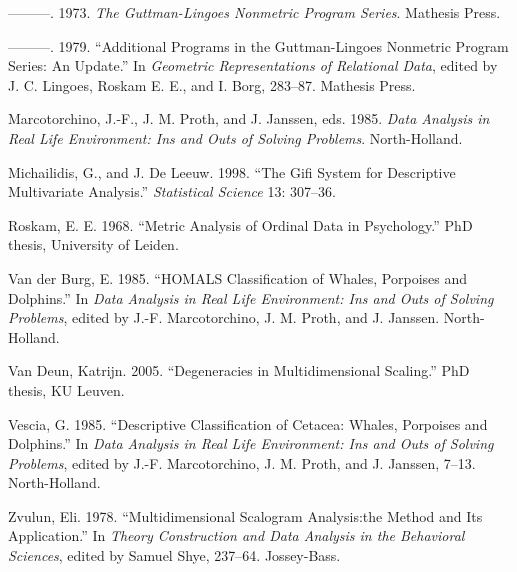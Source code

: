 \documentclass[
  12pt,
]{article}
\newlength{\cslhangindent}
\newenvironment{CSLReferences}[2] %
 {\begin{list}{}{%
  \setlength{\itemindent}{0pt}
  \setlength{\leftmargin}{0pt}
  \setlength{\parsep}{0pt}
  \ifodd #1
   \setlength{\leftmargin}{\cslhangindent}
   \setlength{\itemindent}{-1\cslhangindent}
  \fi
  \setlength{\itemsep}{#2\baselineskip}}}
 {\end{list}}
\begin{document}
\begin{CSLReferences}{1}{0}
---------. 1973. \emph{{The Guttman-Lingoes Nonmetric Program Series}}. Mathesis Press.

---------. 1979. {``Additional Programs in the Guttman-Lingoes Nonmetric Program Series: An Update.''} In \emph{{Geometric Representations of Relational Data}}, edited by J. C. Lingoes, Roskam E. E., and I. Borg, 283--87. Mathesis Press.

Marcotorchino, J.-F., J. M. Proth, and J. Janssen, eds. 1985. \emph{Data Analysis in Real Life Environment: Ins and Outs of Solving Problems}. North-Holland.

Michailidis, G., and J. De Leeuw. 1998. {``The Gifi System for Descriptive Multivariate Analysis.''} \emph{Statistical Science} 13: 307--36.

Roskam, E. E. 1968. {``{Metric Analysis of Ordinal Data in Psychology}.''} PhD thesis, University of Leiden.

Van der Burg, E. 1985. {``HOMALS Classification of Whales, Porpoises and Dolphins.''} In \emph{Data Analysis in Real Life Environment: Ins and Outs of Solving Problems}, edited by J.-F. Marcotorchino, J. M. Proth, and J. Janssen. North-Holland.

Van Deun, Katrijn. 2005. {``Degeneracies in Multidimensional Scaling.''} PhD thesis, KU Leuven.

Vescia, G. 1985. {``Descriptive Classification of Cetacea: Whales, Porpoises and Dolphins.''} In \emph{Data Analysis in Real Life Environment: Ins and Outs of Solving Problems}, edited by J.-F. Marcotorchino, J. M. Proth, and J. Janssen, 7--13. North-Holland.

Zvulun, Eli. 1978. {``Multidimensional Scalogram Analysis:the Method and Its Application.''} In \emph{Theory Construction and Data Analysis in the Behavioral Sciences}, edited by Samuel Shye, 237--64. Jossey-Bass.

\end{CSLReferences}
\end{document}
